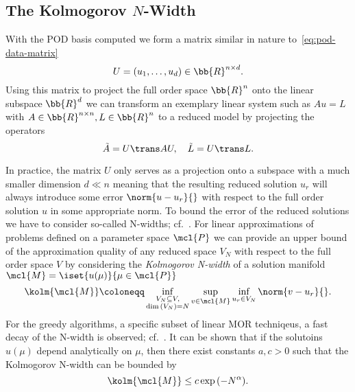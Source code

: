 
\subsection[The Kolmogorov N-Width]{The Kolmogorov {$N$}-Width}\label{subsec:kolmogorov-n-width}

With the POD basis computed we form a matrix similar in nature to~\eqref{eq:pod-data-matrix}
\begin{equation*}
    U = \left( u_1, \dots, u_d \right) \in \bb{R}^{n \times d}.
\end{equation*}
Using this matrix to project the full order space $\bb{R}^n$ onto the linear subspace $\bb{R}^d$ we can transform an exemplary linear system such as $A u = L$ with $A \in \bb{R}^{n \times n}, L \in \bb{R}^n$ to a reduced model by projecting the operators
\begin{equation*}
    \tilde{A} = U\trans A U,\quad \tilde{L} = U\trans L.
\end{equation*}

In practice, the matrix $U$ only serves as a projection onto a subspace with a much smaller dimension $d \ll n$ meaning that the resulting reduced solution $u_r$ will always introduce some error $\norm{u - u_r}{}$ with respect to the full order solution $u$ in some appropriate norm.
To bound the error of the reduced solutions we have to consider so-called N-widths; cf.~\cite{Pinkus1985}.
For linear approximations of problems defined on a parameter space $\mcl{P}$ we can provide an upper bound of the approximation quality of any reduced space $V_N$ with respect to the full order space $V$ by considering the \emph{Kolmogorov N-width} of a solution manifold $\mcl{M} = \iset{u(\mu)}{\mu \in \mcl{P}}$
\begin{equation}
    \kolm{\mcl{M}} \coloneqq \inf\limits_{\substack{V_N \subseteq V,\\\dim{(V_N)} = N}} \sup\limits_{v \in \mcl{M}} \inf\limits_{u_r \in V_N} \norm{v - u_r}{}.
\end{equation}
For the greedy algorithms, a specific subset of linear MOR techniqeus, a fast decay of the N-width is observed; cf.~\cite{Binev2011, DeVore2013}.
It can be shown that if the solutoins $u(\mu)$ depend analytically on $\mu$, then there exist constants $a, c > 0$ such that the Kolmogorov N-width can be bounded by
\begin{equation*}
    \kolm{\mcl{M}} \leq c \exp{(-N^\alpha)}.
\end{equation*}

